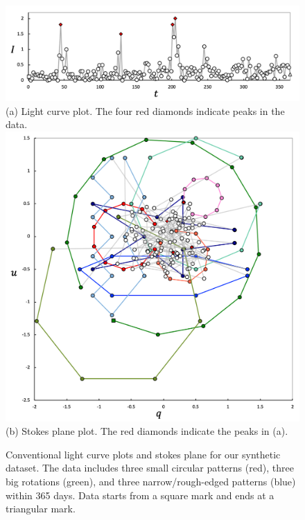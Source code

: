 \begin{figure}[t]
    \centering
    \vspace{3mm}
    \includegraphics[width=.8\linewidth]{vgtc_journal_latex/figures/synthesisDataLightCurveLabel.png}\\
    \footnotesize{\sf (a) Light curve plot. The four red diamonds indicate peaks in the data.}\\
    \includegraphics[width=.83\linewidth]{vgtc_journal_latex/figures/synthesisDataStokesLabel.png}\\
    \footnotesize{\sf (b) Stokes plane plot. The red diamonds indicate the peaks in (a).}
    \caption{Conventional light curve plots and stokes plane for our synthetic dataset. The data includes three small circular patterns (red), three big rotations (green), and three narrow/rough-edged patterns (blue) within 365 days. Data starts from a square mark and ends at a triangular mark.}
    \label{fig:synthesisData}
\end{figure}





